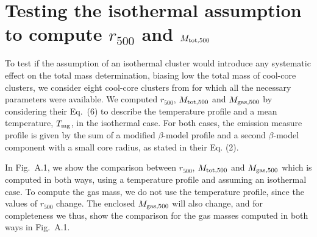 \documentclass{aa}
\begin{document}
\begin{appendix}
\label{app}
\section{Testing the isothermal assumption to compute $r_{500}$ and $M_{\rm tot, 500}$}

To test if the assumption of an isothermal cluster would
introduce any systematic effect on the total mass determination, 
biasing low the total mass of cool-core clusters, we consider eight cool-core
clusters from \citet{V06} for which all the necessary parameters were
available.  We computed $r_{500}$, $M_{\rm tot, 500}$ and $M_{\rm gas,
  500}$ by considering their Eq.~(6) to describe the temperature profile
and a mean temperature,  $T_{\rm mg}$, in the 
isothermal case.  For both cases, the emission measure profile is given by
the sum of a modified $\beta$-model profile and a second $\beta$-model
component with a small core radius, as stated in their Eq. (2).

In Fig.~A.1, we show the comparison between $r_{500}$, $M_{\rm tot,
  500}$ and $M_{\rm gas, 500}$ which is computed in both ways,
  using a temperature profile and assuming an isothermal case.  
To compute the
gas mass, we do not use the temperature profile, since the values of
$r_{500}$ change. The enclosed $M_{\rm gas, 500}$ will also change,
and  for completeness we thus, show the comparison for the gas masses computed in both ways
in Fig.~A.1.

\begin{figure}[ht!]


\end{figure}
\end{appendix}
\end{document}
